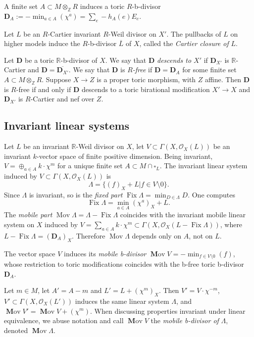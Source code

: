 \documentclass[12pt,twoside]{amsart}
\newcommand{\Z}{{\mathbb Z}}
\newcommand{\R}{{\mathbb R}}
\newcommand{\cO}{{\mathcal O}}
\newcommand{\bD}{{\mathbf D}}
\newcommand{\Fix}{\operatorname{Fix}}
\newcommand{\Mov}{\operatorname{Mov}}
\newcommand{\bMov}{\operatorname{{\mathbf Mov}}}
\theoremstyle{plain}
\theoremstyle{definition}
\theoremstyle{remark}
\begin{document}
A finite set $A\subset M\otimes_\Z R$ induces a toric $R$-b-divisor 
$\bD_A:=-\min_{a\in A}(\chi^a)=\sum_e-h_A(e)E_e$.

Let $L$ be an $R$-Cartier invariant $R$-Weil divisor on $X'$. The pullbacks of $L$
on higher models induce the $R$-b-divisor $\overline{L}$ of $X$, called the 
{\em Cartier closure of} $L$. 

Let $\bD$ be a toric $\R$-b-divisor of $X$. 
We say that $\bD$ {\em descends to $X'$} if $\bD_{X'}$ is $\R$-Cartier and $\bD=\overline{\bD_{X'}}$.
We say that $\bD$ is {\em $R$-free} if $\bD=\bD_A$ for some finite set $A\subset M\otimes_\Z R$.
Suppose $X\to Z$ is a proper toric morphism, with $Z$ affine. Then $\bD$ is $R$-free if and only if 
$\bD$ descends to a toric birational modification $X'\to X$ and $\bD_{X'}$ is $R$-Cartier and 
nef over $Z$. 


\subsection{Invariant linear systems}

Let $L$ be an invariant $\R$-Weil divisor on $X$, let $V\subset \Gamma(X,\cO_X(L))$
be an invariant $k$-vector space of finite positive dimension. Being invariant,
$V=\oplus_{a\in A}k\cdot \chi^m$ for a unique finite set $A\subset M\cap \square_L$.
The invariant linear system induced by $V\subset \Gamma(X,\cO_X(L))$ is 
$$
\Lambda=\{(f)_X+L | f\in V \setminus 0 \}.
$$
Since $\Lambda$ is invariant, so is the {\em fixed part} 
$\Fix\Lambda=\min_{D\in \Lambda}D$. One computes 
$$
\Fix \Lambda=\min_{a\in A}(\chi^a)_X+L.
$$
The {\em mobile part} 
$
\Mov\Lambda=\Lambda-\Fix\Lambda
$ 
coincides with the invariant mobile linear system on $X$ induced by  $V=\sum_{a\in A}k\cdot \chi^m\subset
\Gamma(X,\cO_X(L-\Fix \Lambda))$, where $L-\Fix\Lambda=(\bD_A)_X$. Therefore 
$\Mov\Lambda$ depends only on $A$, not on $L$.

The vector space $V$ induces its {\em mobile b-divisor} $\bMov V=-\min_{f\in V\setminus 0}(f)$,
whose restriction to toric modifications coincides with the b-free toric b-divisor $\bD_A$. 

Let $m\in M$, let $A'=A-m$ and $L'=L+(\chi^m)_X$. Then 
$V'=V\cdot \chi^{-m}$,  $V'\subset \Gamma(X,\cO_X(L'))$ induces the same linear system $\Lambda$,
and $\bMov V'=\bMov V+(\chi^m)$. When discussing properties invariant under linear equivalence,
we abuse notation and call $\bMov V$ the {\em mobile b-divisor of} $\Lambda$, denoted
$\bMov \Lambda$.
\end{document}
